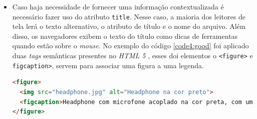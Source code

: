 {\begin{itemize}
\vspace{1.5cm}
{\centerline{\textbf{Caso de uso 2}: Adaptação e construção de imagens acessíveis.} 
As imagens que possuem algum tipo de conteúdo devem ser acessíveis, elas precisam de alguma descrição, seja ela visível ou não. Existe o atributo \lstinline{alt} para a \textit{tag} \lstinline{img}, como exemplificado no código \ref{code3:good}, onde ele serve para descrever o que está presente na imagem. Essa descrição do \lstinline{alt} não aparece visualmente, mas ela é lida pelo leitor de tela, quando o usuário, navegando pelo teclado, passar pela imagem.}
{\begin{lstlisting}[language=html,caption={Uso atributo \lstinline{alt} para descrever o item da imagem.}, label=code3:good]
<img src="headphone.jpg" alt="Headphone na cor preto"> 
\end{lstlisting}}
\item Caso haja necessidade de fornecer uma informação contextualizada é necessário fazer uso do atributo \lstinline{title}. Nesse caso, a maioria dos leitores de tela lerá o texto alternativo, o atributo de título e o nome do arquivo. Além disso, os navegadores exibem o texto do título como dicas de ferramentas quando estão sobre o \textit{mouse}. No exemplo do código \ref{code4:good} foi aplicado duas \textit{tags} semânticas presentes no \textit{HTML 5} \cite{HTML}, esses doi elementos o \lstinline{<figure>} e \lstinline{figcaption>}, servem para associar uma figura a uma legenda. 
{\begin{lstlisting}[language=html,caption={Uso do atributo \textit{alt} em conjunto com as \textit{tags} \textit{figure} e \textit{figurecaption}.}, label=code4:good]
<figure>
  <img src="headphone.jpg" alt="Headphone na cor preto"> 
  <figcaption>Headphone com microfone acoplado na cor preta, com um fio de ótima construção</figcaption>
</figure>
\end{lstlisting}}


\end{itemize}}
